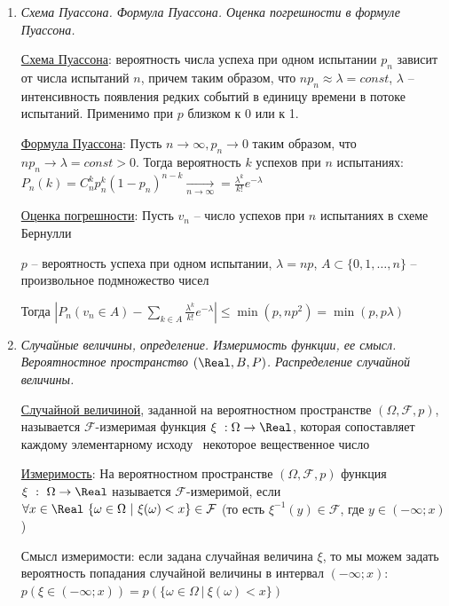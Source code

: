 \begin{enumerate}
    \item \textit{Схема Пуассона. Формула Пуассона. Оценка погрешности в формуле Пуассона.}
    
    \hyperlink{poissonschema}{Схема Пуассона}: вероятность числа успеха при одном испытании $p_n$ зависит от числа испытаний $n$, причем таким образом, что $n p_n \approx \lambda = const$, 
    $\lambda$ -- интенсивность появления редких событий в единицу времени в потоке испытаний. Применимо при $p$ близком к 0 или к 1.

    \hyperlink{poissonformula}{Формула Пуассона}: \Ths Пусть $n \to \infty, p_n \to 0$ таким образом, что $n p_n \to \lambda = const > 0$.
    Тогда вероятность $k$ успехов при $n$ испытаниях: $P_n(k) = C^k_n p_n^k (1 - p_n)^{n - k} \underset{n \to \infty}{\rightarrow} = \frac{\lambda^k}{k!} e^{-\lambda}$

    \hyperlink{errorinpoissonformula}{Оценка погрешности}: \Ths Пусть $v_n$ -- число успехов при $n$ испытаниях в схеме Бернулли

    $p$ -- вероятность успеха при одном испытании, $\lambda = np$, $A \subset \{0, 1, \dots, n\}$ -- произвольное подмножество чисел

    Тогда $|P_n (v_n \in A) - \sum_{k \in A} \frac{\lambda^k}{k!} e^{-\lambda}| \leq \min (p, np^2) = \min (p, p\lambda)$

    \item \textit{Случайные величины, определение. Измеримость функции, ее смысл. Вероятностное пространство $(\Real, B, P)$. Распределение случайной величины.}

    \hyperlink{randomvaluedefinition}{Случайной величиной}, заданной на вероятностном пространстве $(\Omega, \mathcal{F}, p)$, называется
    $\mathcal{F}$-измеримая функция $\xi \ : \Omega \to \Real$, которая сопоставляет каждому элементарному исходу \
    некоторое вещественное число

    \hyperlink{measurabilityoffunction}{Измеримость}: На вероятностном пространстве $(\Omega, \mathcal{F}, p)$ функция $\xi \ : \ \Omega \to \Real$ называется
    $\mathcal{F}$-измеримой, если $\forall x \in \Real \ \{\omega \in \Omega \ | \ \xi(\omega) < x\} \in \mathcal{F}$
    (то есть $\xi^{-1}(y) \in \mathcal{F}$, где $y \in (-\infty; x)$)

    Смысл измеримости: если задана случайная величина $\xi$, то мы можем задать вероятность попадания случайной
    величины в интервал $(-\infty; x)$: $p(\xi \in (-\infty; x)) = p(\{\omega \in \Omega \ | \ \xi(\omega) < x\})$


\end{enumerate}
